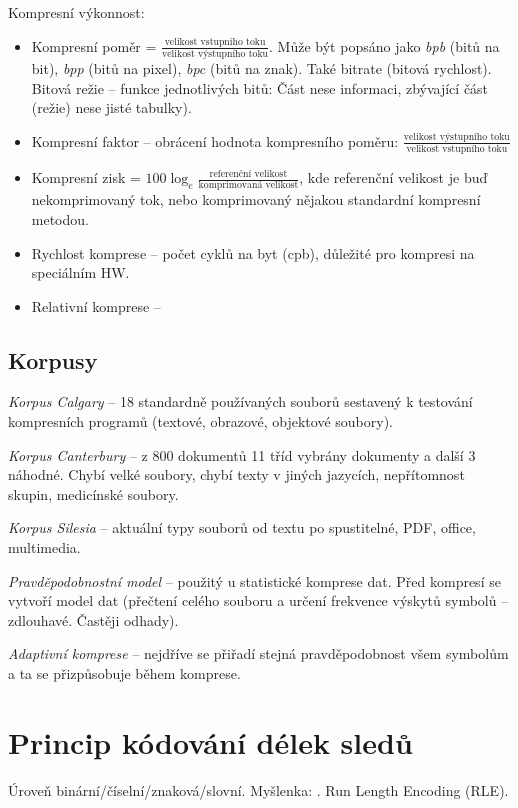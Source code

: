 \documentclass[a4paper, 11pt]{report}
\begin{document}
Kompresní výkonnost:
\begin{itemize}
	\item Kompresní poměr = $\frac{\text{velikost vstupního toku}}{\text{velikost výstupního toku}}$. Může být popsáno jako \emph{bpb} (bitů na bit), \emph{bpp} (bitů na pixel), \emph{bpc} (bitů na znak). Také bitrate (bitová rychlost).\\
	Bitová režie -- funkce jednotlivých bitů: Část nese informaci, zbývající část (režie) nese jisté tabulky).
	\item Kompresní faktor -- obrácení hodnota kompresního poměru: $\frac{\text{velikost výstupního toku}}{\text{velikost vstupního toku}}$
	\item Kompresní zisk = $100 \log_e \frac{\text{referenční velikost}}{\text{komprimovaná velikost}}$, kde referenční velikost je buď nekomprimovaný tok, nebo komprimovaný nějakou standardní kompresní metodou.
	\item Rychlost komprese -- počet cyklů na byt (cpb), důležité pro kompresi na speciálním HW.
	\item Relativní komprese -- 
\end{itemize}

\subsection{Korpusy}
\emph{Korpus Calgary} -- 18 standardně používaných souborů sestavený k testování kompresních programů (textové, obrazové, objektové soubory).

\emph{Korpus Canterbury} -- z 800 dokumentů 11 tříd vybrány  dokumenty a další 3 náhodné. Chybí velké soubory, chybí texty v jiných jazycích, nepřítomnost skupin, medicínské soubory.

\emph{Korpus Silesia} -- aktuální typy souborů od textu po spustitelné, PDF, office, multimedia.

\emph{Pravděpodobnostní model} -- použitý u statistické komprese dat. Před kompresí se vytvoří model dat (přečtení celého souboru a určení frekvence výskytů symbolů -- zdlouhavé. Častěji odhady).

\emph{Adaptivní komprese} -- nejdříve se přiřadí stejná pravděpodobnost všem symbolům a ta se přizpůsobuje během komprese.

\section{Princip kódování délek sledů}
Úroveň binární/číselní/znaková/slovní. Myšlenka: . Run Length Encoding (RLE).
\end{document}
